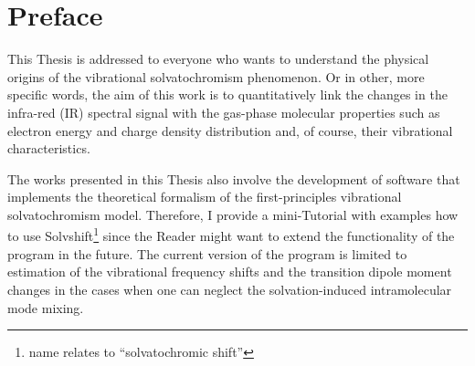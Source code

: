 \documentclass[b5paper,oneside,fleqn,11pt]{book}
\begin{document}
\chapter{Preface}

This Thesis is addressed to everyone who wants to understand the physical
origins of the vibrational solvatochromism phenomenon. Or in other, more specific words, 
the aim of this work is to quantitatively link the changes in the infra\hyp{}red (IR)
spectral signal with the gas\hyp{}phase molecular properties such as electron energy and charge
density distribution and, of course, their vibrational characteristics. 

The works presented in this Thesis also involve the development of software
that implements the theoretical formalism of the first\hyp{}principles vibrational solvatochromism model.
Therefore, I provide a mini\hyp{}Tutorial with examples how to use {\sc Solvshift}\footnote{name relates to 
``solvatochromic shift''} 
since the Reader might want to extend the functionality of the program in the future.
The current version of the program is limited to estimation of the vibrational frequency 
shifts and the transition dipole moment changes in the cases when one can 
neglect the solvation\hyp{}induced intramolecular mode mixing.
\tableofcontents
\mainmatter


\end{document}
